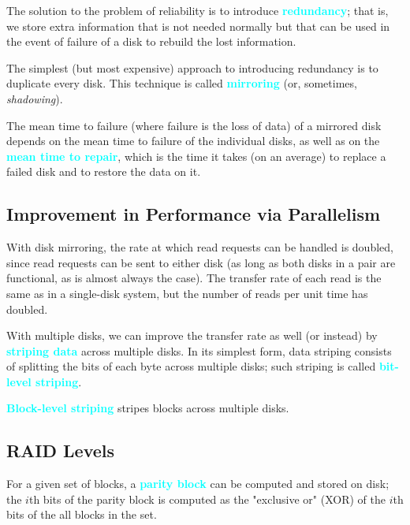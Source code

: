 \documentclass[a4paper,12pt,twoside,openany]{book}
\newcommand{\textcy}[1]{\textbf{\textcolor{cyan}{#1}}}
\begin{document}
The solution to the problem of reliability is to introduce \textcy{redundancy}; that is, we store extra information that is not needed normally but that can be used in the event of failure of a disk to rebuild the lost information.

The simplest (but most expensive) approach to introducing redundancy is to duplicate every disk. This technique is called \textcy{mirroring} (or, sometimes, \textit{shadowing}).

The mean time to failure (where failure is the loss of data) of a mirrored disk depends on the mean time to failure of the individual disks, as well as on the \textcy{mean time to repair}, which is the time it takes (on an average) to replace a failed disk and to restore the data on it.

\subsection{Improvement in Performance via Parallelism}

With disk mirroring, the rate at which read requests can be handled is doubled, since read requests can be sent to either disk (as long as both disks in a pair are functional, as is almost always the case). The transfer rate of each read is the same as in a single-disk system, but the number of reads per unit time has doubled.

With multiple disks, we can improve the transfer rate as well (or instead) by \textcy{striping data} across multiple disks. In its simplest form, data striping consists of splitting the bits of each byte across multiple disks; such striping is called \textcy{bit-level striping}.

\textcy{Block-level striping} stripes blocks across multiple disks.

\subsection{RAID Levels}

For a given set of blocks, a \textcy{parity block} can be computed and stored on disk; the $i$th bits of the parity block is computed as the "exclusive or" (XOR) of the $i$th bits of the all blocks in the set.
\end{document}
